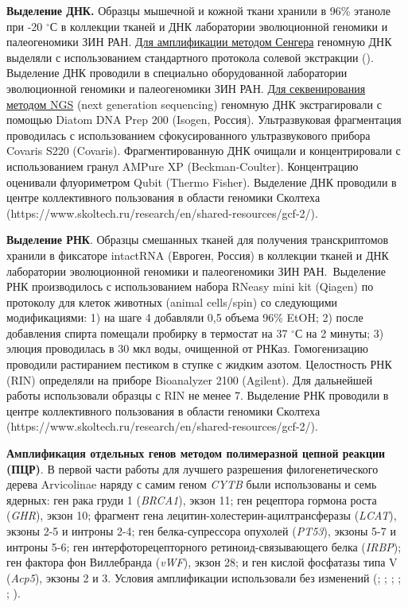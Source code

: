 \textbf{Выделение ДНК.} Образцы мышечной и кожной ткани хранили в 96\% этаноле при -20 $^\circ$С в коллекции тканей и ДНК лаборатории эволюционной геномики и палеогеномики ЗИН РАН. \underline{Для амплификации методом Сенгера} геномную ДНК выделяли с использованием стандартного протокола солевой экстракции (\cite{Miller1999}). Выделение ДНК проводили в специально оборудованной лаборатории эволюционной геномики и палеогеномики ЗИН РАН. \underline{Для секвенирования методом NGS} (next generation sequencing) геномную ДНК экстрагировали с помощью Diatom DNA Prep 200 (Isogen, Россия). Ультразвуковая фрагментация проводилась с использованием сфокусированного ультразвукового прибора Covaris S220 (Covaris). Фрагментированную ДНК очищали и концентрировали с использованием гранул AMPure XP (Beckman-Coulter). Концентрацию оценивали флуориметром Qubit (Thermo Fisher). Выделение ДНК проводили в центре коллективного пользования в области геномики Сколтеха (https://www.skoltech.ru/research/en/shared-resources/gcf-2/).

\textbf{Выделение РНК}. Образцы смешанных тканей для получения транскриптомов хранили в фиксаторе intactRNA (Евроген, Россия) в коллекции тканей и ДНК лаборатории эволюционной геномики и палеогеномики ЗИН РАН. Выделение РНК производилось с использованием набора RNeasy mini kit (Qiagen) по протоколу для клеток животных (animal cells/spin) со следующими модификациями: 1) на шаге 4 добавляли 0,5 объема 96\% EtOH; 2) после добавления спирта помещали пробирку в термостат на 37 $^\circ$С на 2 минуты; 3) элюция проводилась в 30 мкл воды, очищенной от РНКаз. Гомогенизацию проводили растиранием пестиком в ступке с жидким азотом. Целостность РНК (RIN) определяли на приборе Bioanalyzer 2100 (Agilent). Для дальнейшей работы использовали образцы с RIN не менее 7. Выделение РНК проводили в центре коллективного пользования в области геномики Сколтеха (https://www.skoltech.ru/research/en/shared-resources/gcf-2/).

\textbf{Амплификация отдельных генов методом полимеразной цепной реакции (ПЦР)}. В первой части работы для лучшего разрешения филогенетического дерева Arvicolinae наряду с самим геном \textit{CYTB} были использованы и семь ядерных: ген рака груди 1 (\textit{BRCA1}), экзон 11; ген рецептора гормона роста (\textit{GHR}), экзон 10; фрагмент гена лецитин-холестерин-ацилтрансферазы (\textit{LCAT}), экзоны 2-5 и интроны 2-4; ген белка-супрессора опухолей (\textit{PT53}), экзоны 5-7 и интроны 5-6; ген интерфоторецепторного ретиноид-связывающего белка (\textit{IRBP}); ген фактора фон Виллебранда (\textit{vWF}), экзон 28; и ген кислой фосфатазы типа V (\textit{Acp5}), экзоны 2 и 3. Условия амплификации использовали без изменений (\cite{Lebedev2007}; \cite{Ohdachi2001}; \cite{Bannikova2013}; \cite{Abramson2009}; \cite{Petrova2016}; \cite{Poux2006}). 

